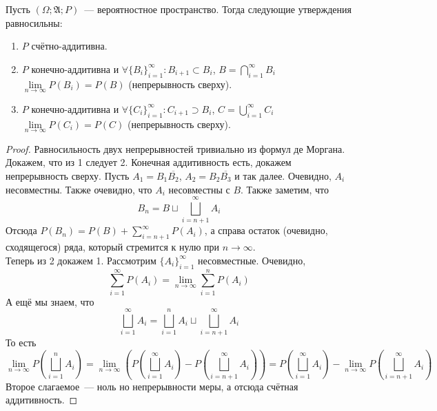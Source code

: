 \documentclass{article}
\newcommand{\A}{{\mathfrak A}}
\begin{document}
    \begin{theorem}
        Пусть $(\Omega;\A;P)$~--- вероятностное пространство. Тогда следующие утверждения равносильны:
        \begin{enumerate}
            \item $P$ счётно-аддитивна.
            \item $P$ конечно-аддитивна и $\forall \{B_i\}_{i=1}^\infty:B_{i+1}\subset B_i$, $B=\bigcap\limits_{i=1}^\infty B_i$ $\lim\limits_{n\to\infty}P(B_i)=P(B)$ (непрерывность сверху).
            \item $P$ конечно-аддитивна и $\forall \{C_i\}_{i=1}^\infty:C_{i+1}\supset B_i$, $C=\bigcup\limits_{i=1}^\infty C_i$ $\lim\limits_{n\to\infty}P(C_i)=P(C)$ (непрерывность сверху).
        \end{enumerate}
    \end{theorem}
    \begin{proof}
        Равносильность двух непрерывностей тривиально из формул де Моргана.\\
        Докажем, что из 1 следует 2. Конечная аддитивность есть, докажем непрерывность сверху. Пусть $A_1=B_1\overline{B_2}$, $A_2=B_2\overline{B_3}$ и так далее. Очевидно, $A_i$ несовместны. Также очевидно, что $A_i$ несовместны с $B$. Также заметим, что
        $$
        B_n=B\sqcup\bigsqcup\limits_{i=n+1}^\infty A_i
        $$
        Отсюда $P(B_n)=P(B)+\sum\limits_{i=n+1}^\infty P(A_i)$, а справа остаток (очевидно, сходящегося) ряда, который стремится к нулю при $n\to\infty$.\\
        Теперь из 2 докажем 1. Рассмотрим $\{A_i\}_{i=1}^\infty$ несовместные. Очевидно,
        $$
        \sum\limits_{i=1}^\infty P(A_i)=\lim\limits_{n\to\infty}\sum\limits_{i=1}^nP(A_i)
        $$
        А ещё мы знаем, что
        $$
        \bigsqcup\limits_{i=1}^\infty A_i=\bigsqcup\limits_{i=1}^nA_i\sqcup\bigsqcup\limits_{i=n+1}^\infty A_i
        $$
        То есть
        $$
        \lim\limits_{n\to\infty}P\left(\bigsqcup\limits_{i=1}^nA_i\right)=
        \lim\limits_{n\to\infty}\left(P\left(\bigsqcup\limits_{i=1}^\infty A_i\right)-P\left(\bigsqcup\limits_{i=n+1}^\infty A_i\right)\right)=
        P\left(\bigsqcup\limits_{i=1}^\infty A_i\right)-\lim\limits_{n\to\infty}P\left(\bigsqcup\limits_{i=n+1}^\infty A_i\right)
        $$
        Второе слагаемое~--- ноль но непрерывности меры, а отсюда счётная аддитивность.
    \end{proof}
\end{document}
